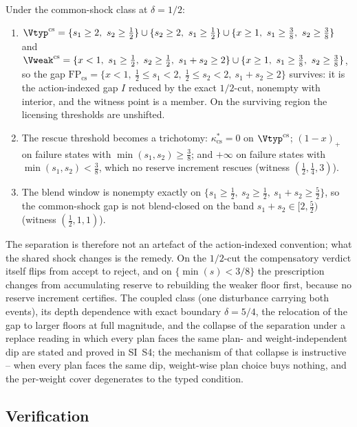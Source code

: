 \begin{proposition}\label{prop:commonshock}
Under the common-shock class at $\delta=1/2$:
\begin{enumerate}[label=\textup{(\roman*)},leftmargin=2em]
\item $\Vtyp^{\mathrm{cs}}=\{s_1\ge2,\ s_2\ge\tfrac12\}\cup\{s_2\ge2,\ s_1\ge\tfrac12\}\cup\{x\ge1,\ s_1\ge\tfrac38,\ s_2\ge\tfrac38\}$ and
$\Vweak^{\mathrm{cs}}=\{x<1,\ s_1\ge\tfrac12,\ s_2\ge\tfrac12,\ s_1+s_2\ge2\}\cup\{x\ge1,\ s_1\ge\tfrac38,\ s_2\ge\tfrac38\}$, so the gap
$\mathrm{FP}_{\mathrm{cs}}=\{x<1,\ \tfrac12\le s_1<2,\ \tfrac12\le s_2<2,\ s_1+s_2\ge2\}$
survives: it is the action-indexed gap $I$ reduced by the exact $1/2$-cut, nonempty with interior, and the witness point is a member. On the surviving region the licensing thresholds are unshifted.
\item The rescue threshold becomes a trichotomy: $\kappa^*_{\mathrm{cs}}=0$ on $\Vtyp^{\mathrm{cs}}$; $(1-x)_+$ on failure states with $\min(s_1,s_2)\ge\tfrac38$; and $+\infty$ on failure states with $\min(s_1,s_2)<\tfrac38$, which no reserve increment rescues (witness $(\tfrac12,\tfrac14,3)$).
\item The blend window is nonempty exactly on $\{s_1\ge\tfrac12,\ s_2\ge\tfrac12,\ s_1+s_2\ge\tfrac52\}$, so the common-shock gap is not blend-closed on the band $s_1+s_2\in[2,\tfrac52)$ (witness $(\tfrac12,1,1)$).
\end{enumerate}
\end{proposition}

The separation is therefore not an artefact of the action-indexed convention; what the shared shock changes is the remedy. On the $1/2$-cut the compensatory verdict itself flips from accept to reject, and on $\{\min(s)<3/8\}$ the prescription changes from accumulating reserve to rebuilding the weaker floor first, because no reserve increment certifies. The coupled class (one disturbance carrying both events), its depth dependence with exact boundary $\delta=5/4$, the relocation of the gap to larger floors at full magnitude, and the collapse of the separation under a replace reading in which every plan faces the same plan- and weight-independent dip are stated and proved in SI~S4; the mechanism of that collapse is instructive -- when every plan faces the same dip, weight-wise plan choice buys nothing, and the per-weight cover degenerates to the typed condition.

\subsection{Verification}\label{sec:verification}

